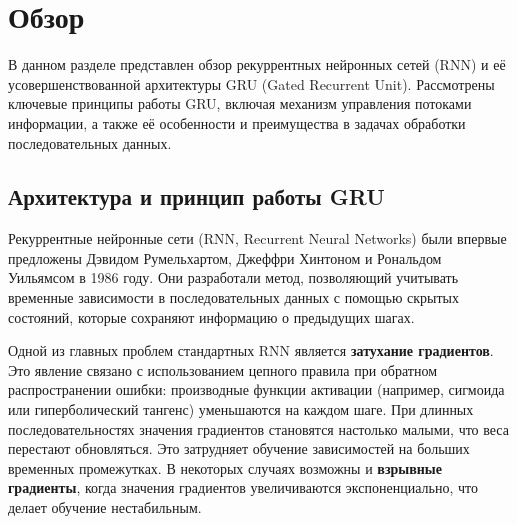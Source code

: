 
\section{Обзор}
\label{sec:relatedworks}
В данном разделе представлен обзор рекуррентных нейронных сетей (RNN) и её усовершенствованной архитектуры GRU (Gated Recurrent Unit). Рассмотрены ключевые принципы работы GRU, включая механизм управления потоками информации, а также её особенности и преимущества в задачах обработки последовательных данных.

\subsection{Архитектура и принцип работы GRU}

Рекуррентные нейронные сети (RNN, Recurrent Neural Networks)\cite{IBM_RNN} были впервые предложены Дэвидом Румельхартом, Джеффри Хинтоном и Рональдом Уильямсом в 1986 году. Они разработали метод, позволяющий учитывать временные зависимости в последовательных данных с помощью скрытых состояний, которые сохраняют информацию о предыдущих шагах.

Одной из главных проблем стандартных RNN является \textbf{затухание градиентов}. Это явление связано с использованием цепного правила при обратном распространении ошибки: производные функции активации (например, сигмоида или гиперболический тангенс) уменьшаются на каждом шаге. При длинных последовательностях значения градиентов становятся настолько малыми, что веса перестают обновляться. Это затрудняет обучение зависимостей на больших временных промежутках. В некоторых случаях возможны и \textbf{взрывные градиенты}, когда значения градиентов увеличиваются экспоненциально, что делает обучение нестабильным.

